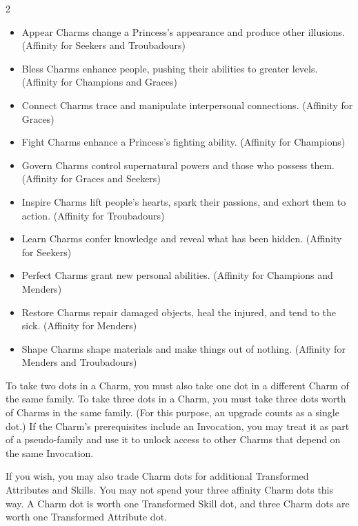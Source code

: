\begin{multicols}{2}
\begin{itemize}
\item Appear Charms change a Princess’s appearance and produce other illusions. (Affinity for Seekers and Troubadours)
\item Bless Charms enhance people, pushing their abilities to greater levels. (Affinity for Champions and Graces)
\item Connect Charms trace and manipulate interpersonal connections. (Affinity for Graces)
\item Fight Charms enhance a Princess’s fighting ability. (Affinity for Champions)
\item Govern Charms control supernatural powers and those who possess them. (Affinity for Graces and Seekers)
\item Inspire Charms lift people’s hearts, spark their passions, and exhort them to action. (Affinity for Troubadours)
\item Learn Charms confer knowledge and reveal what has been hidden. (Affinity for Seekers)
\item Perfect Charms grant new personal abilities. (Affinity for Champions and Menders)
\item Restore Charms repair damaged objects, heal the injured, and tend to the sick. (Affinity for Menders)
\item Shape Charms shape materials and make things out of nothing. (Affinity for Menders and Troubadours)
\end{itemize}

To take two dots in a Charm, you must also take one dot in a different Charm of the same family. To take three dots in a Charm, you must take three dots worth of Charms in the same family. (For this purpose, an upgrade counts as a single dot.) If the Charm's prerequisites include an Invocation, you may treat it as part of a pseudo-family and use it to unlock access to other Charms that depend on the same Invocation. 

If you wish, you may also trade Charm dots for additional Transformed Attributes and Skills. You may not spend your three affinity Charm dots this way. A Charm dot is worth one Transformed Skill dot, and three Charm dots are worth one Transformed Attribute dot.

\begin{mybox}



\end{mybox}
\end{multicols}
